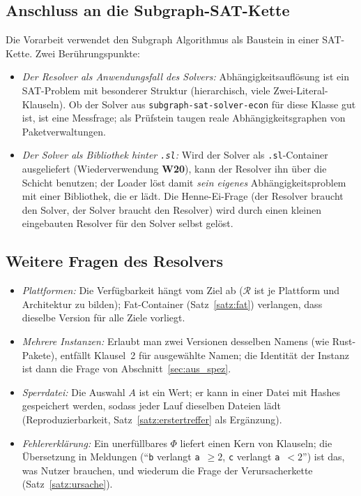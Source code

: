 \documentclass[a4paper,12pt,twoside]{report}
\DeclareRobustCommand{\_}{\ifmmode\mbox{\textunderscore}\else\textunderscore\allowbreak{}\fi}
\theoremstyle{definition}
\newcommand{\W}[1]{\textbf{W#1}}
\begin{document}
\subsection{Anschluss an die Subgraph-SAT-Kette}
Die Vorarbeit \cite{epp2026csubgraph} verwendet den Subgraph Algorithmus als Baustein in einer SAT-Kette. Zwei Berührungspunkte:
\begin{itemize}
	\item \emph{Der Resolver als Anwendungsfall des Solvers:} Abhängigkeitsauflösung ist ein SAT-Problem mit besonderer Struktur (hierarchisch, viele Zwei-Literal-Klauseln). Ob der Solver aus \texttt{subgraph-sat-solver-econ} für diese Klasse gut ist, ist eine Messfrage; als Prüfstein taugen reale Abhängigkeitsgraphen von Paketverwaltungen.
	\item \emph{Der Solver als Bibliothek hinter \texttt{.sl}:} Wird der Solver als \texttt{.sl}-Container ausgeliefert (Wiederverwendung \W{20}), kann der Resolver ihn über die Schicht benutzen; der Loader löst damit \emph{sein eigenes} Abhängigkeitsproblem mit einer Bibliothek, die er lädt. Die Henne-Ei-Frage (der Resolver braucht den Solver, der Solver braucht den Resolver) wird durch einen kleinen eingebauten Resolver für den Solver selbst gelöst.
\end{itemize}

\subsection{Weitere Fragen des Resolvers}
\begin{itemize}
	\item \emph{Plattformen:} Die Verfügbarkeit hängt vom Ziel ab ($\mathcal R$ ist je Plattform und Architektur zu bilden); Fat-Container (Satz~\ref{satz:fat}) verlangen, dass dieselbe Version für alle Ziele vorliegt.
	\item \emph{Mehrere Instanzen:} Erlaubt man zwei Versionen desselben Namens (wie Rust-Pakete), entfällt Klausel~2 für ausgewählte Namen; die Identität der Instanz ist dann die Frage von Abschnitt~\ref{sec:aus_spez}.
	\item \emph{Sperrdatei:} Die Auswahl $A$ ist ein Wert; er kann in einer Datei mit Hashes gespeichert werden, sodass jeder Lauf dieselben Dateien lädt (Reproduzierbarkeit, Satz~\ref{satz:erstertreffer} als Ergänzung).
	\item \emph{Fehlererklärung:} Ein unerfüllbares $\Phi$ liefert einen Kern von Klauseln; die Übersetzung in Meldungen (``\texttt{b} verlangt \texttt{a}~$\ge2$, \texttt{c} verlangt \texttt{a}~$<2$'') ist das, was Nutzer brauchen, und wiederum die Frage der Verursacherkette (Satz~\ref{satz:ursache}).
\end{itemize}
\end{document}
